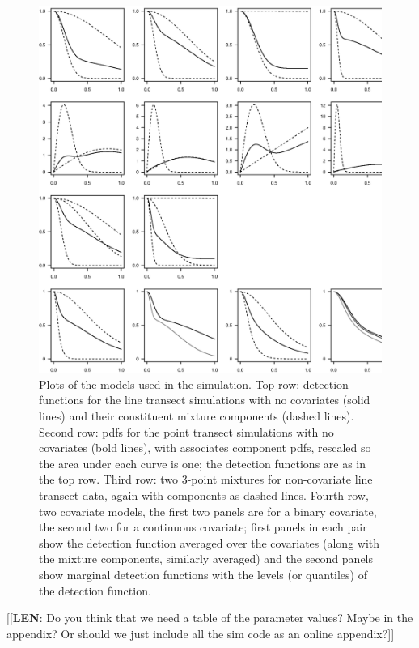 \documentclass[useAMS,referee, usegraphicx]{biom}
\begin{document}
\begin{figure}
\centering
\includegraphics[width=\textwidth]{figs/sim-detfct.eps}
\caption{Plots of the models used in the simulation. Top row: detection functions for the line transect simulations with no covariates (solid lines) and their constituent mixture components (dashed lines). Second row: pdfs for the point transect simulations with no covariates (bold lines), with associates component pdfs, rescaled so the area under each curve is one; the detection functions are as in the top row. Third row: two 3-point mixtures for non-covariate line transect data, again with components as dashed lines. Fourth row, two covariate models, the first two panels are for a binary covariate, the second two for a continuous covariate; first panels in each pair show the detection function averaged over the covariates (along with the mixture components, similarly averaged) and the second panels show marginal detection functions with the levels (or quantiles) of the detection function.}
\label{sim-detfcts}
\end{figure}

[[\textbf{LEN}: Do you think that we need a table of the parameter values? Maybe in the appendix? Or should we just include all the sim code as an online appendix?]]
\end{document}

